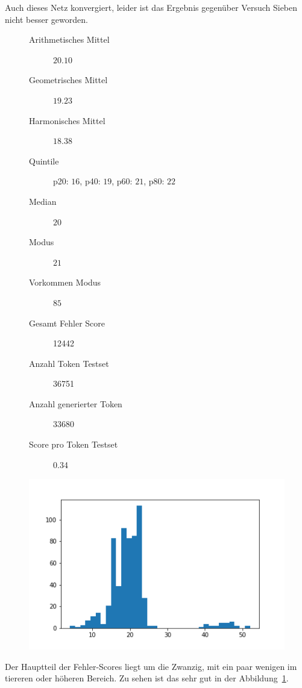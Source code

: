 \documentclass[pdftex,a4paper,halfparskip, article]{scrartcl}
\begin{document}
Auch dieses Netz konvergiert, leider ist das Ergebnis gegenüber Versuch Sieben nicht besser geworden.

\begin{figure}
\centering
\begin{minipage}{.5\textwidth}
  \centering
  \begin{description}
	\item[Arithmetisches Mittel] $20.10$	
	\item[Geometrisches Mittel] $19.23$
	\item[Harmonisches Mittel] $18.38$
	\item[Quintile] p20: $16$, p40: $19$, p60: $21$, p80: $22$
	\item[Median] $20$
	\item[Modus] $21$
	\item[Vorkommen Modus] $85$
	\item[Gesamt Fehler Score] 12442
	\item[Anzahl Token Testset] 36751 
	\item[Anzahl generierter Token] 33680
	\item[Score pro Token Testset]  0.34
\end{description}
  \label{fig:lage_bin14}
\end{minipage}%
\begin{minipage}{.5\textwidth}
  \centering
  \includegraphics[width=1\linewidth]{predictions_bin14_histogramm}
  \label{fig:hist_bin14}
\end{minipage}
\end{figure}

Der Hauptteil der Fehler-Scores liegt um die Zwanzig, mit ein paar wenigen im tiereren oder höheren Bereich. Zu sehen ist das sehr gut in der Abbildung~\ref{fig:hist_bin14}. 
\end{document}
